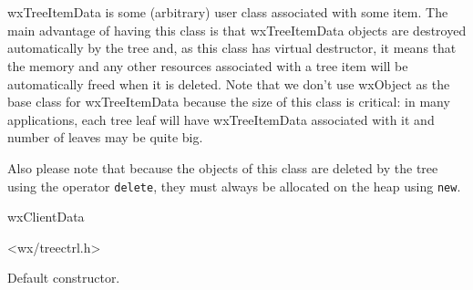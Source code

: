 \section{}\label{wxtreeitemdata}

wxTreeItemData is some (arbitrary) user class associated with some item. The
main advantage of having this class is that wxTreeItemData objects are
destroyed automatically by the tree and, as this class has virtual destructor,
it means that the memory and any other resources associated with a tree item
will be automatically freed when it is deleted. Note that we don't use wxObject
as the base class for wxTreeItemData because the size of this class is
critical: in many applications, each tree leaf will have wxTreeItemData
associated with it and number of leaves may be quite big.

Also please note that because the objects of this class are deleted by the tree
using the operator {\tt delete}, they must always be allocated on the heap
using {\tt new}.


wxClientData


<wx/treectrl.h>




\label{wxtreeitemdataconstr}


Default constructor.



